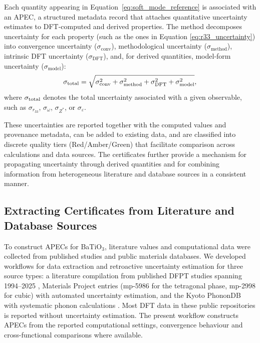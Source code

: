 \documentclass[twocolumn,superscriptaddress,amsmath,amssymb,longbibliography]{revtex4-2}
\begin{document}
Each quantity appearing in Equation~\ref{eq:soft_mode_reference} is associated with an APEC, a structured metadata record that attaches quantitative uncertainty estimates to DFT-computed and derived properties. The method decomposes uncertainty for each property (such as the ones in Equation \ref{eq:r33_uncertainty}) into convergence uncertainty ($\sigma_{\mathrm{conv}}$), methodological uncertainty ($\sigma_{\mathrm{method}}$), intrinsic DFT uncertainty ($\sigma_{\mathrm{DFT}}$), and, for derived quantities, model-form uncertainty ($\sigma_{\mathrm{model}}$):
\begin{equation}
\sigma_{\rm total}
=
\sqrt{
\sigma_{\rm conv}^2+
\sigma_{\rm method}^2+
\sigma_{\rm DFT}^2+
\sigma_{\rm model}^2
},
\label{eq:sigma_sum}
\end{equation}
\noindent where $\sigma_{\rm total}$ denotes the total uncertainty
associated with a given observable, such as
$\sigma_{r_{33}}$, $\sigma_{\omega}$,
$\sigma_{Z^*}$, or $\sigma_{\varepsilon}$.

These uncertainties are reported together with the computed values and provenance metadata, can be added to existing data, and are classified into discrete quality tiers (Red/Amber/Green) that facilitate comparison across calculations and data sources. The certificates further provide a mechanism for propagating uncertainty through derived quantities and for combining information from heterogeneous literature and database sources in a consistent manner.

\subsection{Extracting Certificates from Literature and Database Sources}

To construct APECs for BaTiO$_3$, literature values and computational data were collected from published studies and public materials databases.
 We developed workflows for data extraction and retroactive uncertainty estimation for three
source types: a literature compilation from published
DFPT studies spanning 1994--2025 \cite{Baroni2001,Gonze1997_DFPT}, Materials Project entries
(mp-5986 for the tetragonal phase, mp-2998 for cubic) with automated
uncertainty estimation, and the Kyoto PhononDB with systematic phonon
calculations \cite{Togo2015_phonopy,Togo2023_PhononDB}.
Most DFT data in these public repositories is reported without uncertainty
estimation. The present workflow constructs APECs from the reported computational settings, convergence behaviour and cross-functional comparisons where available.
\end{document}

